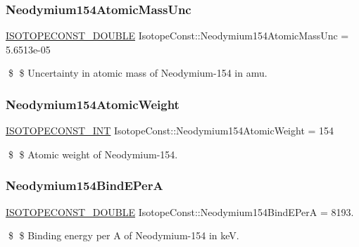 \subsubsection{\texorpdfstring{Neodymium154\+Atomic\+Mass\+Unc}{Neodymium154AtomicMassUnc}}
{\footnotesize\ttfamily \mbox{\hyperlink{group___isotope_const-_macros_ga8f45a7272ce02c0b4c65c44636ed719a}{I\+S\+O\+T\+O\+P\+E\+C\+O\+N\+S\+T\+\_\+\+D\+O\+U\+B\+LE}} Isotope\+Const\+::\+Neodymium154\+Atomic\+Mass\+Unc = 5.\+6513e-\/05}

\$ \$ Uncertainty in atomic mass of Neodymium-\/154 in amu. \mbox{\label{group___isotope_const-_neodymium-_nd154_ga3ceddd507ff82d3772be031e0a226cab}} 
\subsubsection{\texorpdfstring{Neodymium154\+Atomic\+Weight}{Neodymium154AtomicWeight}}
{\footnotesize\ttfamily \mbox{\hyperlink{group___isotope_const-_macros_ga5f18360b3e99483a35c32d789e62621c}{I\+S\+O\+T\+O\+P\+E\+C\+O\+N\+S\+T\+\_\+\+I\+NT}} Isotope\+Const\+::\+Neodymium154\+Atomic\+Weight = 154}

\$ \$ Atomic weight of Neodymium-\/154. \mbox{\label{group___isotope_const-_neodymium-_nd154_gad50890ba5a826b5d0f202837a1d9bf76}} 
\subsubsection{\texorpdfstring{Neodymium154\+Bind\+E\+PerA}{Neodymium154BindEPerA}}
{\footnotesize\ttfamily \mbox{\hyperlink{group___isotope_const-_macros_ga8f45a7272ce02c0b4c65c44636ed719a}{I\+S\+O\+T\+O\+P\+E\+C\+O\+N\+S\+T\+\_\+\+D\+O\+U\+B\+LE}} Isotope\+Const\+::\+Neodymium154\+Bind\+E\+PerA = 8193.}

\$ \$ Binding energy per A of Neodymium-\/154 in keV. \mbox{\label{group___isotope_const-_neodymium-_nd154_ga127cffcd29f24f3a77436907eb2b6179}} 
